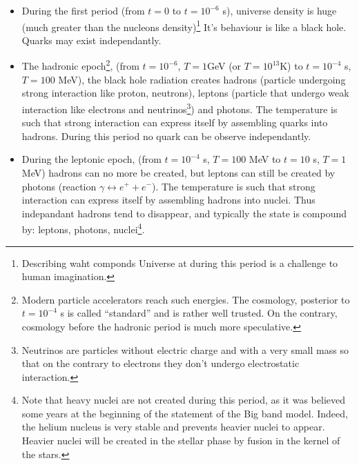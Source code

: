 \documentclass[12pt]{book}
\begin{document}
\begin{itemize}
\item During the first period (from $t=0$ to $t=10^{-6}$ s), universe
density is huge 
(much greater than the nucleons density)\footnote{Describing waht
componds Universe at during this period is a challenge to
human imagination.} It's behaviour is like a black hole. Quarks may
exist independantly. 
\item The hadronic epoch\footnote{Modern particle accelerators reach
such energies. The cosmology, posterior to $t=10^{-4}$ s is called
``standard'' and is rather well trusted. On the contrary, cosmology
before the hadronic period is much more speculative.},%
(from $t=10^{-6}$, $T=1$GeV (or
$T=10^{13}$K) to $t=10^{-4}$ s, $T=100$ MeV), the black hole
radiation creates hadrons (particle undergoing strong interaction like
proton, neutrons), leptons (particle that undergo weak interaction
like electrons and neutrinos\footnote{Neutrinos are particles without
electric charge and with a very small mass so that on the contrary to
electrons they don't undergo electrostatic interaction.}) and photons.
The temperature is such that strong interaction can express itself by
assembling quarks into hadrons. During this period no quark can be
observe independantly.
\item During the leptonic epoch, (from $t=10^{-4}$ s, $T=100$ MeV to
$t=10$ s, $T=1$MeV) hadrons can no
more be created, but leptons can still be created by photons (reaction
$\gamma \leftrightarrow e^+ + e^-$). The temperature is such that
strong interaction can express itself by assembling  hadrons into
nuclei. Thus indepandant hadrons tend to disappear, and typically the
state is compound by: leptons, photons, nuclei\footnote{%
Note that
heavy nuclei are not created during this period, as it was believed
some years at the beginning of the statement of the Big band
model. Indeed, the helium nucleus is very stable and prevents heavier
nuclei to appear. Heavier nuclei will be created in the stellar phase
by fusion in the kernel of the stars.}.%


\end{itemize}
\end{document}
